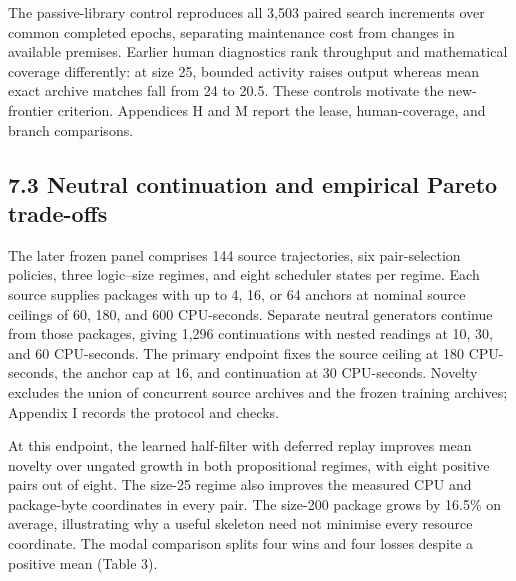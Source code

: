 \documentclass[pdflatex,sn-basic,Numbered]{sn-jnl}
\begin{document}
The passive-library control reproduces all 3,503 paired search increments over common completed epochs, separating maintenance cost from changes in available premises. Earlier human diagnostics rank throughput and mathematical coverage differently: at size 25, bounded activity raises output whereas mean exact archive matches fall from 24 to 20.5. These controls motivate the new-frontier criterion. Appendices H and M report the lease, human-coverage, and branch comparisons.

\subsection*{7.3 Neutral continuation and empirical Pareto trade-offs}\label{neutral-continuation-and-empirical-pareto-trade-offs}

The later frozen panel comprises 144 source trajectories, six pair-selection policies, three logic--size regimes, and eight scheduler states per regime. Each source supplies packages with up to 4, 16, or 64 anchors at nominal source ceilings of 60, 180, and 600 CPU-seconds. Separate neutral generators continue from those packages, giving 1,296 continuations with nested readings at 10, 30, and 60 CPU-seconds. The primary endpoint fixes the source ceiling at 180 CPU-seconds, the anchor cap at 16, and continuation at 30 CPU-seconds. Novelty excludes the union of concurrent source archives and the frozen training archives; Appendix I records the protocol and checks.

At this endpoint, the learned half-filter with deferred replay improves mean novelty over ungated growth in both propositional regimes, with eight positive pairs out of eight. The size-25 regime also improves the measured CPU and package-byte coordinates in every pair. The size-200 package grows by 16.5\% on average, illustrating why a useful skeleton need not minimise every resource coordinate. The modal comparison splits four wins and four losses despite a positive mean (Table 3).

\begingroup
\small
\setlength{\tabcolsep}{3pt}
\renewcommand{\arraystretch}{1.13}
\end{document}
